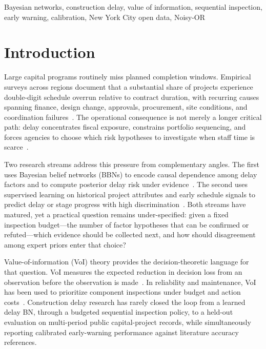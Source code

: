 \documentclass[journal]{IEEEtran}
\begin{document}
\begin{IEEEkeywords}
Bayesian networks, construction delay, value of information, sequential inspection, early warning, calibration, New York City open data, Noisy-OR
\end{IEEEkeywords}

\section{Introduction}
\label{sec:intro}

Large capital programs routinely miss planned completion windows. Empirical surveys across regions document that a substantial share of projects experience double-digit schedule overrun relative to contract duration, with recurring causes spanning finance, design change, approvals, procurement, site conditions, and coordination failures~\cite{Assaf2006,Sambasivan2007,Doloi2012}. The operational consequence is not merely a longer critical path: delay concentrates fiscal exposure, constrains portfolio sequencing, and forces agencies to choose which risk hypotheses to investigate when staff time is scarce~\cite{Flyvbjerg2009,Love2015}.

Two research streams address this pressure from complementary angles. The first uses Bayesian belief networks (BBNs) to encode causal dependence among delay factors and to compute posterior delay risk under evidence~\cite{Luu2009,Nasir2003,Zhang2021BNMCS,Ji2021,Khodabakhshian2025}. The second uses supervised learning on historical project attributes and early schedule signals to predict delay or stage progress with high discrimination~\cite{Egwim2021,Tagharobi2025,Regona2024,Abioye2021}. Both streams have matured, yet a practical question remains under-specified: given a fixed inspection budget---the number of factor hypotheses that can be confirmed or refuted---which evidence should be collected next, and how should disagreement among expert priors enter that choice?

Value-of-information (VoI) theory provides the decision-theoretic language for that question. VoI measures the expected reduction in decision loss from an observation before the observation is made~\cite{Howard1966,Memarzadeh2016,Song2021}. In reliability and maintenance, VoI has been used to prioritize component inspections under budget and action costs~\cite{Malings2016,Yuan2021,Fauriat2020}. Construction delay research has rarely closed the loop from a learned delay BN, through a budgeted sequential inspection policy, to a held-out evaluation on multi-period public capital-project records, while simultaneously reporting calibrated early-warning performance against literature accuracy references.
\end{document}
